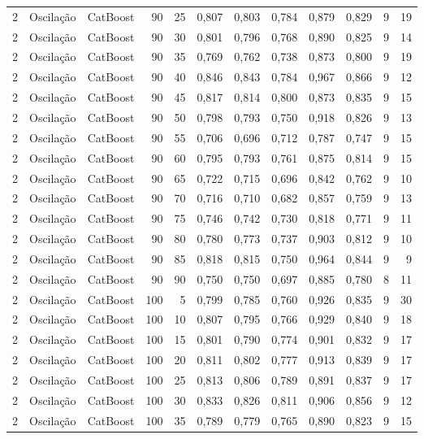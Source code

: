\begin{longtable}{@{}rllrrrrrrrrr@{}}
2 & Oscilação & CatBoost & 90 & 25 & 0,807 & 0,803 & 0,784 & 0,879 & 0,829 & 9 & 19 \\
2 & Oscilação & CatBoost & 90 & 30 & 0,801 & 0,796 & 0,768 & 0,890 & 0,825 & 9 & 14 \\
2 & Oscilação & CatBoost & 90 & 35 & 0,769 & 0,762 & 0,738 & 0,873 & 0,800 & 9 & 19 \\
2 & Oscilação & CatBoost & 90 & 40 & 0,846 & 0,843 & 0,784 & 0,967 & 0,866 & 9 & 12 \\
2 & Oscilação & CatBoost & 90 & 45 & 0,817 & 0,814 & 0,800 & 0,873 & 0,835 & 9 & 15 \\
2 & Oscilação & CatBoost & 90 & 50 & 0,798 & 0,793 & 0,750 & 0,918 & 0,826 & 9 & 13 \\
2 & Oscilação & CatBoost & 90 & 55 & 0,706 & 0,696 & 0,712 & 0,787 & 0,747 & 9 & 15 \\
2 & Oscilação & CatBoost & 90 & 60 & 0,795 & 0,793 & 0,761 & 0,875 & 0,814 & 9 & 15 \\
2 & Oscilação & CatBoost & 90 & 65 & 0,722 & 0,715 & 0,696 & 0,842 & 0,762 & 9 & 10 \\
2 & Oscilação & CatBoost & 90 & 70 & 0,716 & 0,710 & 0,682 & 0,857 & 0,759 & 9 & 13 \\
2 & Oscilação & CatBoost & 90 & 75 & 0,746 & 0,742 & 0,730 & 0,818 & 0,771 & 9 & 11 \\
2 & Oscilação & CatBoost & 90 & 80 & 0,780 & 0,773 & 0,737 & 0,903 & 0,812 & 9 & 10 \\
2 & Oscilação & CatBoost & 90 & 85 & 0,818 & 0,815 & 0,750 & 0,964 & 0,844 & 9 & 9 \\
2 & Oscilação & CatBoost & 90 & 90 & 0,750 & 0,750 & 0,697 & 0,885 & 0,780 & 8 & 11 \\
2 & Oscilação & CatBoost & 100 & 5 & 0,799 & 0,785 & 0,760 & 0,926 & 0,835 & 9 & 30 \\
2 & Oscilação & CatBoost & 100 & 10 & 0,807 & 0,795 & 0,766 & 0,929 & 0,840 & 9 & 18 \\
2 & Oscilação & CatBoost & 100 & 15 & 0,801 & 0,790 & 0,774 & 0,901 & 0,832 & 9 & 17 \\
2 & Oscilação & CatBoost & 100 & 20 & 0,811 & 0,802 & 0,777 & 0,913 & 0,839 & 9 & 17 \\
2 & Oscilação & CatBoost & 100 & 25 & 0,813 & 0,806 & 0,789 & 0,891 & 0,837 & 9 & 17 \\
2 & Oscilação & CatBoost & 100 & 30 & 0,833 & 0,826 & 0,811 & 0,906 & 0,856 & 9 & 12 \\
2 & Oscilação & CatBoost & 100 & 35 & 0,789 & 0,779 & 0,765 & 0,890 & 0,823 & 9 & 15 \\

\end{longtable}
